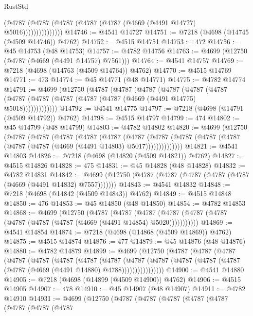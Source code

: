 \begin{lexlean}{RustStd}
\begin{coremodule}
                      (@4787 (@4787 (@4787 (@4787 (@4787 (@4669 (@4491 @14727) @5016)))))))))))))))
@14746 := @4541 @14727
@14751 := @7218 (@4698 (@14745 (@4509 @14746)) @4762)
@14752 := @4515 @14751
@14753 := 472
@14756 := @45 @14753 (@48 @14753)
@14757 := @4782 @14756
@14763 := @4699 (@12750 (@4787 (@4669 (@4491 @14757) @7561)))
@14764 := @4541 @14757
@14769 := @7218 (@4698 (@14763 (@4509 @14764)) @4762)
@14770 := @4515 @14769
@14771 := 473
@14774 := @45 @14771 (@48 @14771)
@14775 := @4782 @14774
@14791 := @4699
    (@12750
      (@4787
        (@4787
          (@4787
            (@4787
              (@4787
                (@4787 (@4787 (@4787 (@4787 (@4787 (@4787 (@4669 (@4491 @14775) @5018)))))))))))))
@14792 := @4541 @14775
@14797 := @7218 (@4698 (@14791 (@4509 @14792)) @4762)
@14798 := @4515 @14797
@14799 := 474
@14802 := @45 @14799 (@48 @14799)
@14803 := @4782 @14802
@14820 := @4699
    (@12750
      (@4787
        (@4787
          (@4787
            (@4787
              (@4787
                (@4787
                  (@4787
                    (@4787 (@4787 (@4787 (@4787 (@4787 (@4669 (@4491 @14803) @5017))))))))))))))
@14821 := @4541 @14803
@14826 := @7218 (@4698 (@14820 (@4509 @14821)) @4762)
@14827 := @4515 @14826
@14828 := 475
@14831 := @45 @14828 (@48 @14828)
@14832 := @4782 @14831
@14842 := @4699 (@12750 (@4787 (@4787 (@4787 (@4787 (@4787 (@4669 (@4491 @14832) @7557)))))))
@14843 := @4541 @14832
@14848 := @7218 (@4698 (@14842 (@4509 @14843)) @4762)
@14849 := @4515 @14848
@14850 := 476
@14853 := @45 @14850 (@48 @14850)
@14854 := @4782 @14853
@14868 := @4699
    (@12750
      (@4787
        (@4787
          (@4787 (@4787 (@4787 (@4787 (@4787 (@4787 (@4787 (@4669 (@4491 @14854) @5020)))))))))))
@14869 := @4541 @14854
@14874 := @7218 (@4698 (@14868 (@4509 @14869)) @4762)
@14875 := @4515 @14874
@14876 := 477
@14879 := @45 @14876 (@48 @14876)
@14880 := @4782 @14879
@14899 := @4699
    (@12750
      (@4787
        (@4787
          (@4787
            (@4787
              (@4787
                (@4787
                  (@4787
                    (@4787
                      (@4787
                        (@4787
                          (@4787 (@4787 (@4787 (@4787 (@4669 (@4491 @14880) @4788))))))))))))))))
@14900 := @4541 @14880
@14905 := @7218 (@4698 (@14899 (@4509 @14900)) @4762)
@14906 := @4515 @14905
@14907 := 478
@14910 := @45 @14907 (@48 @14907)
@14911 := @4782 @14910
@14931 := @4699
    (@12750
      (@4787
        (@4787
          (@4787
            (@4787
              (@4787
                (@4787
                  (@4787
                    (@4787

\end{coremodule}
\end{lexlean}

